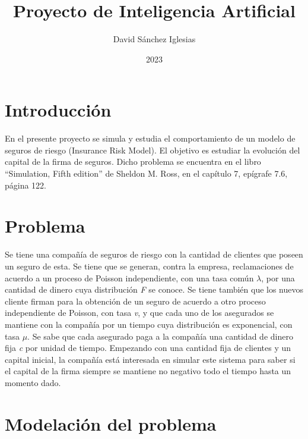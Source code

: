 \documentclass[spanish]{article}
\title{Proyecto de Inteligencia Artificial}
\author{David Sánchez Iglesias}
\date{2023}
\begin{document}
\maketitle

\section{Introducci\'on}
En el presente proyecto se simula y estudia el comportamiento de un modelo de seguros de riesgo (Insurance Risk Model).
El objetivo es estudiar la evoluci\'on del capital de la firma de seguros.
Dicho problema se encuentra en el libro ``Simulation, Fifth edition'' de Sheldon M. Ross, en el cap\'itulo 7, ep\'igrafe 7.6, p\'agina 122.

\section{Problema}
Se tiene una compa\~n\'ia de seguros de riesgo con la cantidad de clientes que poseen un seguro de esta. Se tiene que se generan, contra la empresa, reclamaciones de acuerdo a un proceso de Poisson independiente, con una tasa com\'un $\lambda$, por una cantidad de dinero cuya distribuci\'on \textit{F} se conoce. Se tiene tambi\'en que los nuevos cliente firman para la obtenci\'on de un seguro de acuerdo a otro proceso independiente de Poisson, con tasa \textit{v}, y que cada uno de los asegurados se mantiene con la compa\~n\'ia por un tiempo cuya distribuci\'on es exponencial, con tasa $\mu$. Se sabe que cada asegurado paga a la compa\~n\'ia una cantidad de dinero fija \textit{c} por unidad de tiempo.
Empezando con una cantidad fija de clientes y un capital inicial, la compa\~n\'ia est\'a interesada en simular este sistema para saber si el capital de la firma siempre se mantiene no negativo todo el tiempo hasta un momento dado.

\section{Modelaci\'on del problema}
\end{document}

